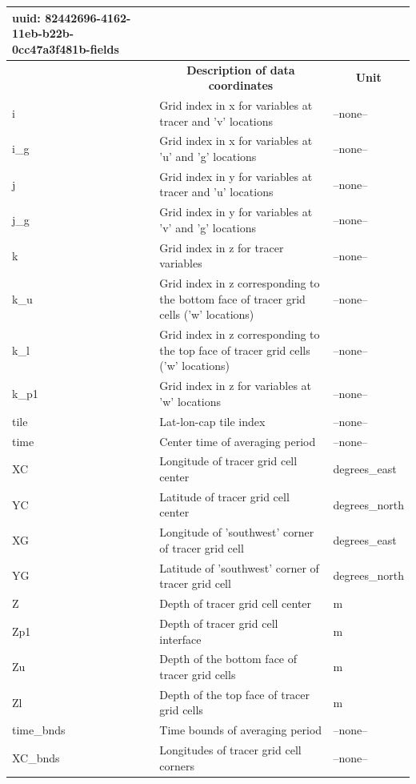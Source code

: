 \begin{longtable}{|m{}|m{}|m{}|}
{    uuid:                            82442696-4162-11eb-b22b-0cc47a3f481b-fields} \\ 
\hline \endhead \hline \endfoot
\rowcolor{lightgray} \multicolumn{1}{|c|}{\textbf{Coordinates}} & \multicolumn{1}{|c|}{\textbf{Description of data coordinates}} &  \multicolumn{1}{|c|}{\textbf{Unit}}\\ \hline
i &Grid index in x for variables at tracer and 'v' locations &--none--  \\ \hline
i\_g &Grid index in x for variables at 'u' and 'g' locations &--none--  \\ \hline
j &Grid index in y for variables at tracer and 'u' locations &--none--  \\ \hline
j\_g &Grid index in y for variables at 'v' and 'g' locations &--none--  \\ \hline
k &Grid index in z for tracer variables &--none--  \\ \hline
k\_u &Grid index in z corresponding to the bottom face of tracer grid cells ('w' locations) &--none--  \\ \hline
k\_l &Grid index in z corresponding to the top face of tracer grid cells ('w' locations) &--none--  \\ \hline
k\_p1 &Grid index in z for variables at 'w' locations &--none--  \\ \hline
tile &Lat-lon-cap tile index &--none--  \\ \hline
time &Center time of averaging period &--none--  \\ \hline
XC &Longitude of tracer grid cell center &degrees\_east  \\ \hline
YC &Latitude of tracer grid cell center &degrees\_north  \\ \hline
XG &Longitude of 'southwest' corner of tracer grid cell &degrees\_east  \\ \hline
YG &Latitude of 'southwest' corner of tracer grid cell &degrees\_north  \\ \hline
Z &Depth of tracer grid cell center &m  \\ \hline
Zp1 &Depth of tracer grid cell interface &m  \\ \hline
Zu &Depth of the bottom face of tracer grid cells &m  \\ \hline
Zl &Depth of the top face of tracer grid cells &m  \\ \hline
time\_bnds &Time bounds of averaging period &--none--  \\ \hline
XC\_bnds &Longitudes of tracer grid cell corners &--none--  \\ \hline

\end{longtable}
